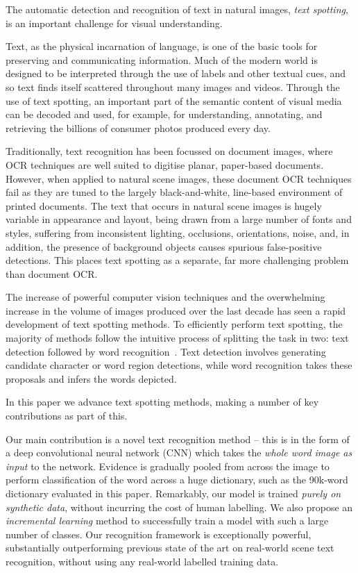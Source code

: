 \documentclass[twocolumn]{svjour3}          \smartqed  \usepackage{epsfig}
\begin{document}
The automatic detection and recognition of text in natural images, \emph{text spotting}, is an important challenge for visual understanding. 

Text, as the physical incarnation of language, is one of the basic tools for preserving and communicating information. Much of the modern world is designed to be interpreted through the use of labels and other textual cues, and so text finds itself scattered throughout many images and videos. Through the use of text spotting, an important part of the semantic content of visual media can be decoded and used, for example, for understanding, annotating, and retrieving the billions of consumer photos produced every day.

Traditionally, text recognition has been focussed on document images, where OCR techniques are well suited to digitise planar, paper-based documents. However, when applied to natural scene images, these document OCR techniques fail as they are tuned to the largely black-and-white, line-based environment of printed documents. The text that occurs in natural scene images is hugely variable in appearance and layout, being drawn from a large number of fonts and styles, suffering from inconsistent lighting, occlusions, orientations, noise, and, in addition, the presence of background objects causes spurious false-positive detections. This places text spotting as a separate, far more challenging problem than document OCR.

The increase of powerful computer vision techniques and the overwhelming increase in the volume of images produced over the last decade has seen a rapid development of text spotting methods. To efficiently perform text spotting, the majority of methods follow the intuitive process of splitting the task in two: text detection followed by word recognition~\cite{Chen04text}. Text detection involves generating candidate character or word region detections, while word recognition takes these proposals and infers the words depicted.

In this paper we advance text spotting methods, making a number of key contributions as part of this.

Our main contribution is a novel text recognition method -- this is in the form of a deep convolutional neural network (CNN) \cite{Lecun98} which takes the \emph{whole word image as input} to the network. Evidence is gradually pooled from across the image to perform classification of the word across a huge dictionary, such as the 90k-word dictionary evaluated in this paper. Remarkably, our model is trained \emph{purely on synthetic data}, without incurring the cost of human labelling. We also propose an \emph{incremental learning} method to successfully train a model with such a large number of classes. Our recognition framework is exceptionally powerful, substantially outperforming previous state of the art on real-world scene text recognition, without using any real-world labelled training data.  
\end{document}
